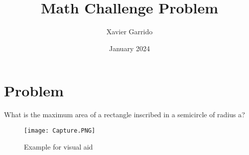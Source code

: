 \documentclass{article}
\title{Math Challenge Problem}
\author{Xavier Garrido}
\date{January 2024}
\begin{document}
\maketitle

\section{Problem}

What is the maximum area of a rectangle inscribed in a semicircle of radius a?

\begin{figure}[htp]
    \centering
    \texttt{[image: Capture.PNG]}
    \caption{Example for visual aid}
    \label{fig:geo}
\end{figure}
\end{document}
